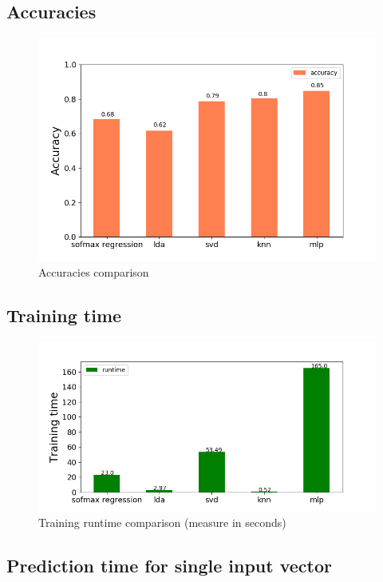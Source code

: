 \documentclass[12,]{article}
\begin{document}
\hypertarget{accuracies}{%
\subsection{Accuracies}\label{accuracies}}

\begin{figure}[H]
  \begin{center}
  \includegraphics[width=0.7\columnwidth]{./Accuracies.png}
  \end{center}
\caption{Accuracies comparison}
\end{figure}

\hypertarget{training-time}{%
\subsection{Training time}\label{training-time}}

\begin{figure}[H]
  \begin{center}
  \includegraphics[width=0.7\columnwidth]{./training_time.png}
  \end{center}
\caption{Training runtime comparison (measure in seconds)}
\end{figure}

\hypertarget{prediction-time-for-single-input-vector}{%
\subsection{Prediction time for single input
vector}\label{prediction-time-for-single-input-vector}}
\end{document}
